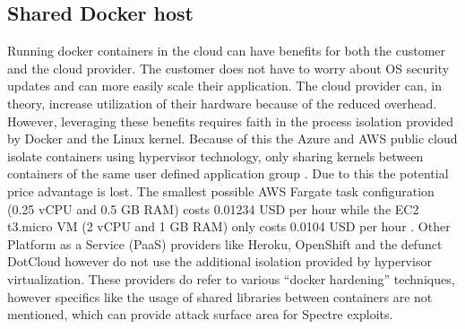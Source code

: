\documentclass[conference,compsoc,final,a4paper]{IEEEtran}
\begin{document}
\subsection{Shared Docker host}
Running docker containers in the cloud can have benefits for both the customer and the cloud provider. The customer does not have to worry about OS security updates and
can more easily scale their application. The cloud provider can, in theory, increase utilization of their hardware because of the reduced overhead. However, leveraging
these benefits requires faith in the process isolation provided by Docker and the Linux kernel. Because of this the Azure and AWS public cloud isolate containers using
hypervisor technology, only sharing kernels between containers of the same user defined application group \cite{fargateIsolation, azureIsolation}. Due to this the
potential price advantage is lost. The smallest possible AWS Fargate task configuration (0.25 vCPU and 0.5 GB RAM) costs 0.01234 USD per hour\cite{fargatePricing}
while the EC2 t3.micro VM (2 vCPU and 1 GB RAM) only costs 0.0104 USD per hour \cite{ec2Pricing}. Other Platform as a Service (PaaS) providers like
Heroku\cite{herokuIsolation}, OpenShift\cite{openshiftIsolation} and the defunct DotCloud however do not use the additional isolation provided
by hypervisor virtualization\cite{zhang2014cross}. These providers do refer to various \enquote{docker hardening} techniques, however specifics like the usage of
shared libraries between containers are not mentioned, which can provide attack surface area for Spectre exploits\cite{retpolineTurner}.
\end{document}
